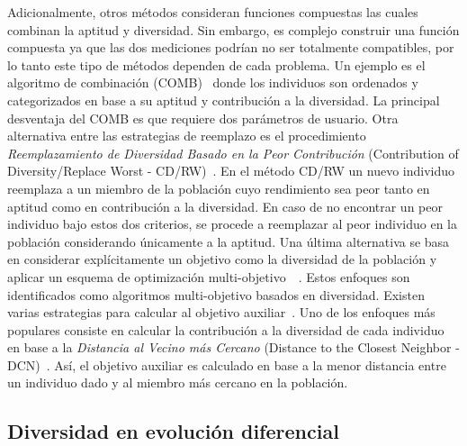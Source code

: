 Adicionalmente, otros métodos consideran funciones compuestas las cuales combinan la aptitud y diversidad.
%
Sin embargo, es complejo construir una función compuesta ya que las dos mediciones podrían no ser totalmente compatibles, por lo tanto este tipo de métodos dependen de cada problema.
%
Un ejemplo es el algoritmo de combinación (COMB)~\cite{vidal2013hybrid} donde los individuos son ordenados y categorizados en base a su aptitud y contribución a la diversidad.
%
La principal desventaja del COMB es que requiere dos parámetros de usuario.
%
Otra alternativa entre las estrategias de reemplazo es el procedimiento \textit{Reemplazamiento de Diversidad Basado en la Peor Contribución} (Contribution of Diversity/Replace Worst - CD/RW)~\cite{lozano2008replacement}.
%
En el método CD/RW un nuevo individuo reemplaza a un miembro de la población cuyo rendimiento sea peor tanto en aptitud como en contribución a la diversidad.
%
En caso de no encontrar un peor individuo bajo estos dos criterios, se procede a reemplazar al peor individuo en la población considerando únicamente a la aptitud.
%
Una última alternativa se basa en considerar explícitamente un objetivo como la diversidad de la población y aplicar un esquema de optimización multi-objetivo~\cite{bui2005multiobjective}~\cite{mouret2011novelty}.
%
Estos enfoques son identificados como algoritmos multi-objetivo basados en diversidad.
%
Existen varias estrategias para calcular al objetivo auxiliar~\cite{segura2013using}.
%
Uno de los enfoques más populares consiste en calcular la contribución a la diversidad de cada individuo en base a la \textit{Distancia al Vecino más Cercano} (Distance to the Closest Neighbor - DCN)~\cite{segura2016novel}.
%
Así, el objetivo auxiliar es calculado en base a la menor distancia entre un individuo dado y al miembro más cercano en la población.
%


\subsection{Diversidad en evolución diferencial}

